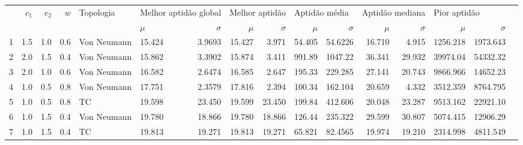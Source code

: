 \begin{tabular}{lrrrllrrrrrrrrrr}
\toprule
{} & $c_1$ & $c_2$ & $w$ & Topologia   & \multicolumn{2}{l}{Melhor aptidão global} & \multicolumn{2}{l}{Melhor aptidão} & \multicolumn{2}{l}{Aptidão média} & \multicolumn{2}{l}{Aptidão mediana} & \multicolumn{2}{l}{Pior aptidão}                            \\
{} &       &       &     &             & $\mu$                                     & $\sigma$                           & $\mu$                             & $\sigma$                            & $\mu$  & $\sigma$ & $\mu$  & $\sigma$ & $\mu$    & $\sigma$ \\
\midrule
1  & 1.5   & 1.0   & 0.6 & Von Neumann & 15.424                                    & 3.9693                             & 15.427                            & 3.971                               & 54.405 & 54.6226  & 16.710 & 4.915    & 1256.218 & 1973.643 \\
2  & 2.0   & 1.5   & 0.4 & Von Neumann & 15.862                                    & 3.3902                             & 15.874                            & 3.411                               & 991.89 & 1047.22  & 36.341 & 29.932   & 39974.04 & 54332.32 \\
3  & 2.0   & 1.0   & 0.6 & Von Neumann & 16.582                                    & 2.6474                             & 16.585                            & 2.647                               & 195.33 & 229.285  & 27.141 & 20.743   & 9866.966 & 14652.23 \\
4  & 1.0   & 0.5   & 0.8 & Von Neumann & 17.751                                    & 2.3579                             & 17.816                            & 2.394                               & 100.34 & 162.104  & 20.659 & 4.332    & 3512.359 & 8764.795 \\
5  & 1.0   & 0.5   & 0.8 & TC          & 19.598                                    & 23.450                             & 19.599                            & 23.450                              & 199.84 & 412.606  & 20.048 & 23.287   & 9513.162 & 22921.10 \\
6  & 1.0   & 1.5   & 0.4 & Von Neumann & 19.780                                    & 18.866                             & 19.780                            & 18.866                              & 126.44 & 235.322  & 29.599 & 30.807   & 5074.415 & 12906.29 \\
7  & 1.0   & 1.5   & 0.4 & TC          & 19.813                                    & 19.271                             & 19.813                            & 19.271                              & 65.821 & 82.4565  & 19.974 & 19.210   & 2314.998 & 4811.549 \\

\end{tabular}
